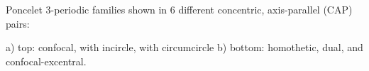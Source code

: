 Poncelet 3-periodic families shown in 6 different concentric, axis-parallel (CAP) pairs:

a) top: confocal, with incircle, with circumcircle
b) bottom: homothetic, dual, and confocal-excentral.